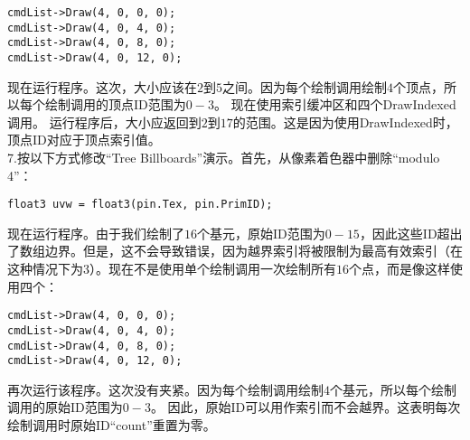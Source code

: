 
\begin{lstlisting}
cmdList->Draw(4, 0, 0, 0);
cmdList->Draw(4, 0, 4, 0);
cmdList->Draw(4, 0, 8, 0);
cmdList->Draw(4, 0, 12, 0);
\end{lstlisting}

\begin{flushleft}
现在运行程序。这次，大小应该在$2$到$5$之间。因为每个绘制调用绘制$4$个顶点，所以每个绘制调用的顶点ID范围为$0-3$。 现在使用索引缓冲区和四个DrawIndexed调用。 运行程序后，大小应返回到$2$到$17$的范围。这是因为使用DrawIndexed时，顶点ID对应于顶点索引值。\\

7.按以下方式修改“Tree Billboards”演示。首先，从像素着色器中删除“modulo 4”：\\
\end{flushleft}

\begin{lstlisting}
float3 uvw = float3(pin.Tex, pin.PrimID);
\end{lstlisting}

\begin{flushleft}
现在运行程序。由于我们绘制了$16$个基元，原始ID范围为$0-15$，因此这些ID超出了数组边界。但是，这不会导致错误，因为越界索引将被限制为最高有效索引（在这种情况下为3）。现在不是使用单个绘制调用一次绘制所有$16$个点，而是像这样使用四个：\\
\end{flushleft}

\begin{lstlisting}
cmdList->Draw(4, 0, 0, 0);
cmdList->Draw(4, 0, 4, 0);
cmdList->Draw(4, 0, 8, 0);
cmdList->Draw(4, 0, 12, 0);
\end{lstlisting}

\begin{flushleft}
再次运行该程序。这次没有夹紧。因为每个绘制调用绘制$4$个基元，所以每个绘制调用的原始ID范围为$0-3$。 因此，原始ID可以用作索引而不会越界。这表明每次绘制调用时原始ID“count”重置为零。\\
\end{flushleft}